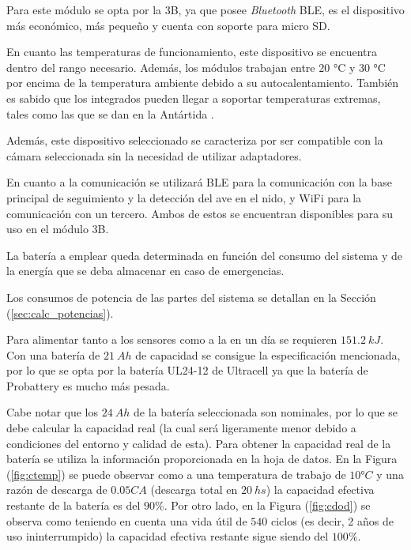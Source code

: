 Para este módulo se opta por la \rspi 3B, ya que posee \textit{Bluetooth} BLE, es el dispositivo más económico, más pequeño y cuenta con soporte para micro SD.

En cuanto las temperaturas de funcionamiento, este dispositivo se encuentra dentro del rango necesario. Además, los módulos \rspi trabajan entre 20 °C y 30 °C por encima de la temperatura ambiente debido a su autocalentamiento. También es sabido que los integrados \rpi pueden llegar a soportar temperaturas extremas, tales como las que se dan en la Antártida \cite{ref:Penguin}.

Además, este dispositivo seleccionado se caracteriza por ser compatible con la cámara seleccionada sin la necesidad de utilizar adaptadores.


En cuanto a la comunicación se utilizará BLE para la comunicación con la base principal de seguimiento y la detección del ave en el nido, y WiFi para la comunicación con un tercero.
Ambos de estos se encuentran disponibles para su uso en el módulo \rspi 3B.



La batería a emplear queda determinada en función del consumo del sistema y de la energía que se deba almacenar en caso de emergencias. 

Los consumos de potencia de las partes del sistema se detallan en la Sección (\ref{sec:calc_potencias}).

Para alimentar tanto a los sensores como a la \rpi en un día se requieren $151.2 \ kJ$. Con una batería de $21 \ Ah$ de capacidad se consigue la especificación mencionada, por lo que se opta por la batería UL24-12 de Ultracell ya que la batería de Probattery es mucho más pesada.

Cabe notar que los $24 \ Ah$ de la batería seleccionada son nominales, por lo que se debe calcular la capacidad real (la cual será ligeramente menor debido a condiciones del entorno y calidad de esta). Para obtener la capacidad real de la batería se utiliza la información proporcionada en la hoja de datos. En la Figura (\ref{fig:ctemp}) se puede observar como a una temperatura de trabajo de $10°C$ y una razón de descarga de $0.05CA$ (descarga total en $20 \ hs$) la capacidad efectiva restante de la batería es del $90\% $. Por otro lado, en la Figura (\ref{fig:cdod}) se observa como teniendo en cuenta una vida útil de $540$ ciclos (es decir, 2 años de uso ininterrumpido) la capacidad efectiva restante sigue siendo del $100\%$.
 

